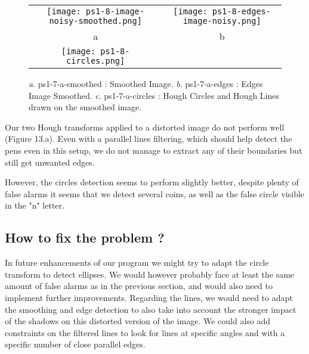 \documentclass[a4paper,11pt]{article}
\begin{document}
 \begin{figure}[H]
\begin{center}
\begin{tabular}{cc}
\texttt{[image: ps1-8-image-noisy-smoothed.png]}&
\texttt{[image: ps1-8-edges-image-noisy.png]}\\
	a&b\\
\texttt{[image: ps1-8-circles.png]}\\	
\end{tabular}
\end{center}
 \caption{
\textit{a}. ps1-7-a-smoothed : Smoothed Image.  \textit{b}. ps1-7-a-edges : Edges Image Smoothed. 
\textit{c}. ps1-7-a-circles :  Hough Circles and Hough Lines drawn on the smoothed image.}
\label{ps1-7}
\end{figure}

Our two Hough transforms applied to a distorted image do not perform well (Figure 13.a). Even with a parallel lines filtering, which should help detect the pens even in this setup, we do not manage to extract any of their boundaries
but still get unwanted edges.

However, the circles detection seems to perform slightly better, despite plenty of false alarms it seems that we detect several coins, as well as the false circle visible in the "n" letter.

\subsection{How to fix the problem ?}

In future enhancements of our program we might try to adapt the circle transform to detect ellipses. We would however probably face at least the same amount of false alarms as in the previous section, and would also need to implement further improvements.
Regarding the lines, we would need to adapt the smoothing and edge detection to also take into account the stronger impact of the shadows on this distorted version of the image. We could also add constraints on the filtered lines to look for lines at specific angles and with a specific number of close parallel edges.
\end{document}
